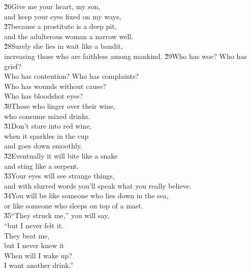 \begin{poetry}
\poeml \v{26}Give me your heart, my son, \\
\poemll    and keep your eyes fixed on my ways, \\
\poeml \v{27}because a prostitute is a deep pit, \\
\poemll    and the adulterous woman a narrow well. \\
\poeml \v{28}Surely she lies in wait like a bandit, \\
\poemll    increasing those who are faithless among mankind.
\poeml \v{29}Who has woe? Who has grief? \\
\poemll    Who has contention? Who has complaints? \\
\poeml Who has wounds without cause? \\
\poemll    Who has bloodshot eyes? \\
\poeml \v{30}Those who linger over their wine, \\
\poemll    who consume mixed drinks. \\
\poeml \v{31}Don't stare into red wine, \\
\poemll    when it sparkles in the cup \\
\poemlll       and goes down smoothly. \\
\poeml \v{32}Eventually it will bite like a snake \\
\poemll    and sting like a serpent. \\
\poeml \v{33}Your eyes will see strange things, \\
\poemll    and with slurred words you'll speak what you really believe. \\
\poeml \v{34}You will be like someone who lies down in the sea, \\
\poemll    or like someone who sleeps on top of a mast. \\
\poeml \v{35}``They struck me,'' you will say, \\
\poemll    ``but I never felt it. \\
\poeml They beat me, \\
\poemll    but I never knew it \\
\poeml When will I wake up? \\
\poemll    I want another drink.''
\end{poetry}

